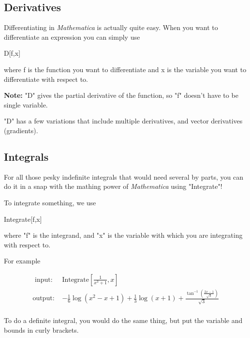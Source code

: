 \documentclass[11pt,a4paper,twoside]{article}
\begin{document}
			\subsection{Derivatives}
						
				Differentiating in \textit{Mathematica} is actually quite easy.  When you want to differentiate an expression you can simply use 
					
				\begin{center} D[f,x] \end{center}
					
				where f is the function you want to differentiate and x is the variable you want to differentiate with respect to.
					
				\textbf{Note:} "D" gives the partial derivative of the function, so "f" doesn't have to be single variable.
					
				"D" has a few variations that include multiple derivatives, and vector derivatives (gradients).
						
			\subsection{Integrals}
						
				For all those pesky indefinite integrals that would need several by parts, you can do it in a snap with the mathing power of \textit{Mathematica} using "Integrate"!
					
				To integrate something, we use
					
				\begin{center}
					
					Integrate[f,x]
					
				\end{center}
					
				where "f" is the integrand, and "x" is the variable with which you are integrating with respect to.
						
				For example
						
				\begin{align*}
					\text{ input: }& \text{Integrate} \left[ \frac{1}{x^3 + 1}, x \right] \\		
					\text{output: }& -\frac{1}{6} \log \left(x^2-x+1\right)+\frac{1}{3} \log (x+1)+\frac{\tan ^{-1}\left(\frac{2 x-1}{\sqrt{3}}\right)}{\sqrt{3}} \\
				\end{align*}
						
				To do a definite integral, you would do the same thing, but put the variable and bounds in curly brackets. 
						
\end{document}
